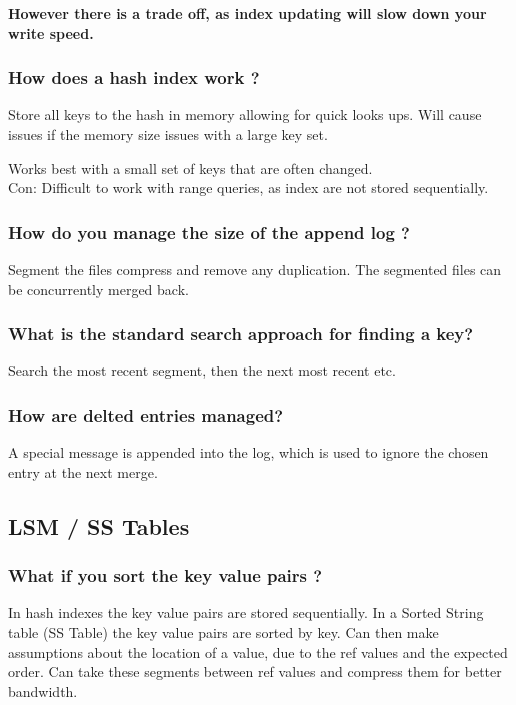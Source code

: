 \documentclass[11pt]{scrartcl} %
\begin{document}
\textbf{However there is a trade off, as index updating will slow down your write speed.}

\subsubsection{How does a hash index work ?}

Store all keys to the hash in memory allowing for quick looks ups. Will cause issues
if the memory size issues with a large key set. 

Works best with a small set of keys that are often changed.\\

Con: Difficult to work with range queries, as index are not stored sequentially.

\subsubsection{How do you manage the size of the append log ?}

Segment the files compress and remove any duplication. The segmented files can be
concurrently merged back.

\subsubsection{What is the standard search approach for finding a key?}

Search the most recent segment, then the next most recent etc.

\subsubsection{How are delted entries managed?}

A special message is appended into the log, which is used to ignore the chosen entry
at the next merge.

\subsection{LSM / SS Tables}

\subsubsection{What if you sort the key value pairs ?}

In hash indexes the key value pairs are stored sequentially. In a Sorted String table (SS Table)
the key value pairs are sorted by key. Can then make assumptions about the location of a value,
due to the ref values and the expected order. Can take these segments between ref values and 
compress them for better bandwidth.
\end{document}
